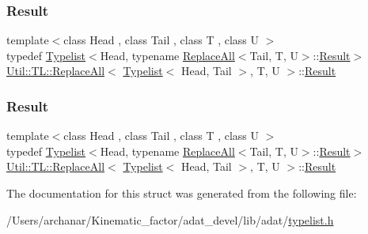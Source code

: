 \subsubsection{\texorpdfstring{Result}{Result}\hspace{0.1cm}{\footnotesize\ttfamily [1/2]}}
{\footnotesize\ttfamily template$<$class Head , class Tail , class T , class U $>$ \\
typedef \mbox{\hyperlink{structUtil_1_1Typelist}{Typelist}}$<$Head, typename \mbox{\hyperlink{structUtil_1_1TL_1_1ReplaceAll}{Replace\+All}}$<$Tail, T, U$>$\+::\mbox{\hyperlink{structUtil_1_1TL_1_1ReplaceAll_3_01Typelist_3_01Head_00_01Tail_01_4_00_01T_00_01U_01_4_ae088fac6604aa56701fce6cb8b402178}{Result}}$>$ \mbox{\hyperlink{structUtil_1_1TL_1_1ReplaceAll}{Util\+::\+T\+L\+::\+Replace\+All}}$<$ \mbox{\hyperlink{structUtil_1_1Typelist}{Typelist}}$<$ Head, Tail $>$, T, U $>$\+::\mbox{\hyperlink{structUtil_1_1TL_1_1ReplaceAll_3_01Typelist_3_01Head_00_01Tail_01_4_00_01T_00_01U_01_4_ae088fac6604aa56701fce6cb8b402178}{Result}}}

\mbox{\label{structUtil_1_1TL_1_1ReplaceAll_3_01Typelist_3_01Head_00_01Tail_01_4_00_01T_00_01U_01_4_ae088fac6604aa56701fce6cb8b402178}} 
\subsubsection{\texorpdfstring{Result}{Result}\hspace{0.1cm}{\footnotesize\ttfamily [2/2]}}
{\footnotesize\ttfamily template$<$class Head , class Tail , class T , class U $>$ \\
typedef \mbox{\hyperlink{structUtil_1_1Typelist}{Typelist}}$<$Head, typename \mbox{\hyperlink{structUtil_1_1TL_1_1ReplaceAll}{Replace\+All}}$<$Tail, T, U$>$\+::\mbox{\hyperlink{structUtil_1_1TL_1_1ReplaceAll_3_01Typelist_3_01Head_00_01Tail_01_4_00_01T_00_01U_01_4_ae088fac6604aa56701fce6cb8b402178}{Result}}$>$ \mbox{\hyperlink{structUtil_1_1TL_1_1ReplaceAll}{Util\+::\+T\+L\+::\+Replace\+All}}$<$ \mbox{\hyperlink{structUtil_1_1Typelist}{Typelist}}$<$ Head, Tail $>$, T, U $>$\+::\mbox{\hyperlink{structUtil_1_1TL_1_1ReplaceAll_3_01Typelist_3_01Head_00_01Tail_01_4_00_01T_00_01U_01_4_ae088fac6604aa56701fce6cb8b402178}{Result}}}



The documentation for this struct was generated from the following file\+:\begin{DoxyCompactItemize}
\item 
/\+Users/archanar/\+Kinematic\+\_\+factor/adat\+\_\+devel/lib/adat/\mbox{\hyperlink{lib_2adat_2typelist_8h}{typelist.\+h}}\end{DoxyCompactItemize}
